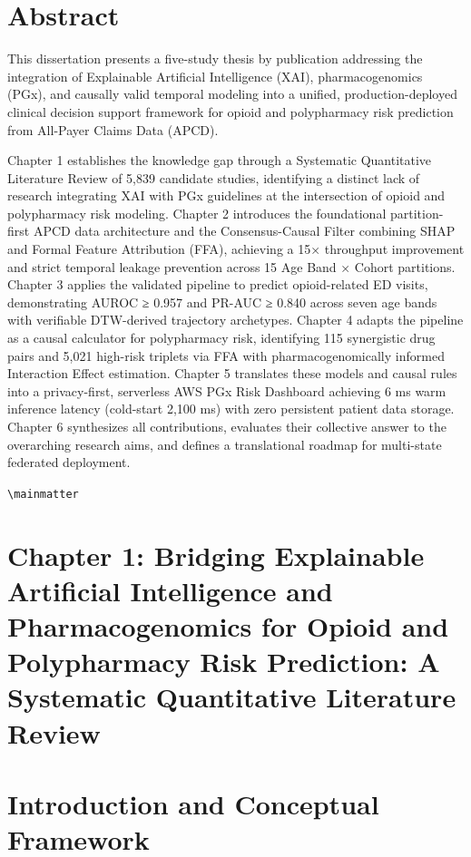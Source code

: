 \documentclass[
  12pt,
]{book}
\begin{document}
\newpage

\chapter*{Abstract}\label{abstract}

This dissertation presents a five-study thesis by publication addressing
the integration of Explainable Artificial Intelligence (XAI),
pharmacogenomics (PGx), and causally valid temporal modeling into a
unified, production-deployed clinical decision support framework for
opioid and polypharmacy risk prediction from All-Payer Claims Data
(APCD).

Chapter 1 establishes the knowledge gap through a Systematic
Quantitative Literature Review of 5,839 candidate studies, identifying a
distinct lack of research integrating XAI with PGx guidelines at the
intersection of opioid and polypharmacy risk modeling. Chapter 2
introduces the foundational partition-first APCD data architecture and
the Consensus-Causal Filter combining SHAP and Formal Feature
Attribution (FFA), achieving a 15× throughput improvement and strict
temporal leakage prevention across 15 Age Band × Cohort partitions.
Chapter 3 applies the validated pipeline to predict opioid-related ED
visits, demonstrating AUROC ≥ 0.957 and PR-AUC ≥ 0.840 across seven age
bands with verifiable DTW-derived trajectory archetypes. Chapter 4
adapts the pipeline as a causal calculator for polypharmacy risk,
identifying 115 synergistic drug pairs and 5,021 high-risk triplets via
FFA with pharmacogenomically informed Interaction Effect estimation.
Chapter 5 translates these models and causal rules into a privacy-first,
serverless AWS PGx Risk Dashboard achieving 6 ms warm inference latency
(cold-start 2,100 ms) with zero persistent patient data storage. Chapter
6 synthesizes all contributions, evaluates their collective answer to
the overarching research aims, and defines a translational roadmap for
multi-state federated deployment.

\texttt{\textbackslash{}mainmatter}

\chapter{Chapter 1: Bridging Explainable Artificial Intelligence and
Pharmacogenomics for Opioid and Polypharmacy Risk Prediction: A
Systematic Quantitative Literature Review}\label{chap-1}

\chapter{Introduction and Conceptual Framework}\label{sec-intro}
\end{document}

